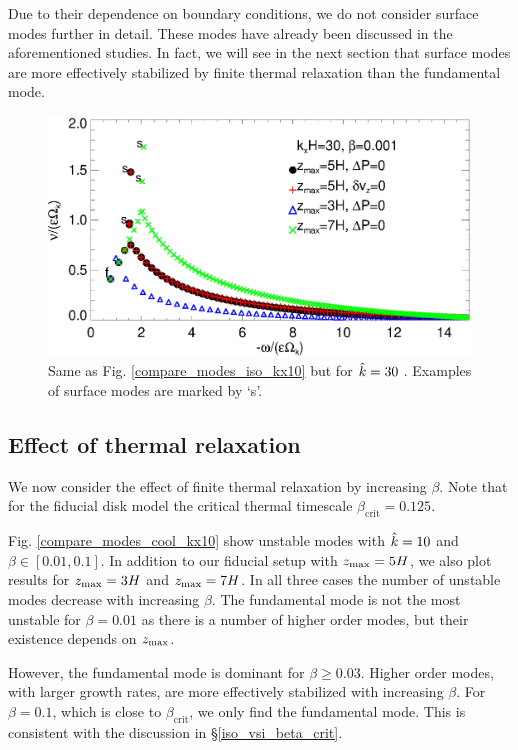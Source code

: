 Due to their dependence on boundary conditions, we 
do not consider surface modes further in detail. These modes have
already been discussed in the aforementioned studies. In fact, we will
see in the next section that surface modes are more effectively
stabilized by finite thermal relaxation than the fundamental mode. %

\begin{figure}
  \includegraphics[width=\linewidth]{figures/compare_modes_iso_kx30_tags.ps}
  \caption{Same as Fig. \ref{compare_modes_iso_kx10} but for $\hat{k}=30$
    \label{compare_modes_iso_kx30}. Examples of surface modes are
    marked by `s'. 
  }
\end{figure}


\subsection{Effect of thermal relaxation}\label{therm_relax_eff}
We now consider the effect of finite thermal relaxation by increasing 
$\beta$. Note that for the fiducial disk model the critical thermal 
timescale $\beta_\mathrm{crit} = 0.125$.  

Fig. \ref{compare_modes_cool_kx10} show unstable modes with $\hat{k}=10$ 
and $\beta\in[0.01,0.1]$. In addition to our fiducial setup with 
$z_\mathrm{max}=5H$, we also plot results for $z_\mathrm{max}=3H$ and $z_\mathrm{max}=7H$. In all 
three cases the number of unstable modes decrease with increasing
$\beta$. The fundamental mode is not the most unstable for 
$\beta=0.01$ as there is a number of higher order modes, but 
their existence depends on $z_\mathrm{max}$. 

However, the fundamental mode is dominant for $\beta \geq 
0.03$. Higher order modes, with larger growth rates, are more
effectively stabilized with increasing $\beta$. For $\beta=0.1$, which
is close to $\beta_\mathrm{crit}$, we only find the fundamental
mode. This is consistent with the discussion in 
\S\ref{iso_vsi_beta_crit}.   

